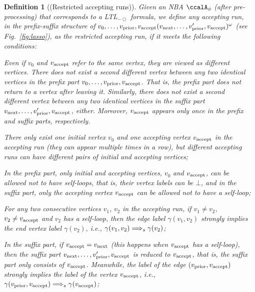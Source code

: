 \documentclass[Afour,sageh,times]{sagej}
\newtheorem{defn}[thm]{Definition}
\newcounter{listcounter}
\newenvironment{noindlist}
 {\begin{list}{(\alph{listcounter})~~}{\usecounter{listcounter} \labelsep=0em \labelwidth=0em \leftmargin=0em \itemindent=0em}}
 {\end{list}}
\newcommand{\ltl}{ {\it LTL}$_{-\bigcirc}$ }
\newcommand{\autop}{\ccalA_{\phi}}
\newcommand{\vertex}[1]{v_{\textup{#1}}}
\newcommand{\simplies}{\DOTSB\Longrightarrow}
\begin{document}
\begin{defn}[(Restricted accepting runs)]\label{defn:run}
  Given an NBA $\autop$ (after pre-processing) that corresponds to a \ltl formula, we define  any accepting run, in the prefix-suffix structure of $v_0, \ldots, \vertex{prior}, \vertex{accept} (\vertex{next}, \ldots, \vertex{prior}', \vertex{accept})^\omega$ (see Fig.~\ref{fig:lasso}), as   the restricted accepting run,   if it  meets the following conditions:
  \begin{noindlist}
    \setlength\itemsep{0em}
  \item \label{cond:a} Even if $v_0 $ and $ \vertex{accept}$ refer to the same vertex, they are viewed as different vertices.  There does not exist a  second  different vertex between any two identical vertices  in the prefix part  $v_0, \ldots, \vertex{prior}, \vertex{accept}$. That is, the prefix part does not return to a vertex after leaving it. Similarly, there does not exist a second different vertex  between any two identical vertices in the suffix part  $\vertex{next}, \ldots, \vertex{prior}', \vertex{accept}$, either. Moreover,  $\vertex{accept}$ appears only once  in the prefix and suffix parts, respectively.
  \item \label{cond:b} There only exist one initial vertex $v_0$ and one  accepting vertex $\vertex{accept}$ in the accepting run (they can appear multiple times in a row), but different accepting runs can have different pairs of initial and accepting vertices;
  \item \label{cond:c} In the prefix part, only initial and accepting vertices, $v_0$ and $\vertex{accept}$, can be allowed not to have  self-loops, that is, their vertex labels  can be $\bot$, and in the suffix part,  only the accepting vertex $\vertex{accept}$ can be allowed not to have a self-loop;
 \item  \label{cond:d} For any two consecutive vertices $v_1$, $v_2$ in the accepting run, if $v_1 \neq v_2$, $v_2\neq \vertex{accept}$ and $v_2$ has a self-loop, then the edge label $\gamma(v_1, v_2)$  strongly implies  the end vertex label $\gamma(v_2)$, i.e., $\gamma(v_1, v_2) \simplies_s \gamma(v_2)$;
   \item \label{cond:e} In the suffix part, if $\vertex{accept} = \vertex{next}$ (this happens when $\vertex{accept}$ has a self-loop), then the suffix part $\vertex{next}, \ldots, \vertex{prior}', \vertex{accept}$ is reduced to $ \vertex{accept}$, that is, the suffix part only consists of  $\vertex{accept}$. Meanwhile, the label of the edge $(\vertex{prior}, \vertex{accept})$ strongly implies the label of the vertex $\vertex{accept}$, i.e., $\gamma(\vertex{prior}, \vertex{accept}) \simplies_s  \gamma(\vertex{accept})$;

\end{noindlist}
\end{defn}
\end{document}
